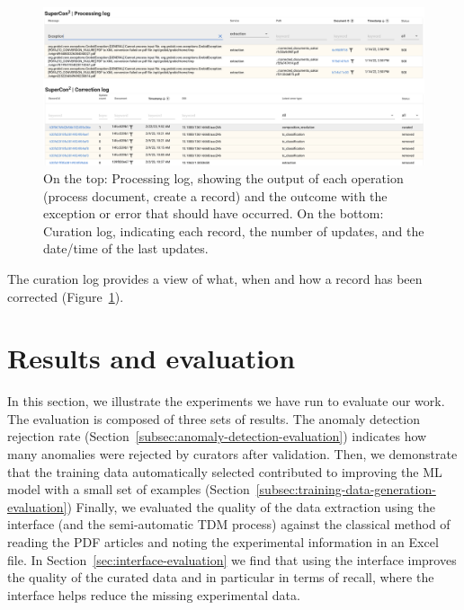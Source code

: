 \documentclass[a4paper]{article}
\begin{document}
\begin{figure}[ht]
  \centering
  \includegraphics[width=1\textwidth]{images/processing-curation-log.png} 
  \caption{On the top: Processing log, showing the output of each operation (process document, create a record) and the outcome with the exception or error that should have occurred. On the bottom: Curation log, indicating each record, the number of updates, and the date/time of the last updates.}
  \label{fig:processing-curation-log}
\end{figure}

The curation log provides a view of what, when and how a record has been corrected (Figure~\ref{fig:processing-curation-log}).





\section{Results and evaluation}

In this section, we illustrate the experiments we have run to evaluate our work. 
The evaluation is composed of three sets of results. 
The anomaly detection rejection rate (Section~\ref{subsec:anomaly-detection-evaluation}) indicates how many anomalies were rejected by curators after validation. 
Then, we demonstrate that the training data automatically selected contributed to improving the ML model with a small set of examples (Section~\ref{subsec:training-data-generation-evaluation}) 
Finally, we evaluated the quality of the data extraction using the interface (and the semi-automatic TDM process) against the classical method of reading the PDF articles and noting the experimental information in an Excel file. In Section~\ref{sec:interface-evaluation} we find that using the interface improves the quality of the curated data and in particular in terms of recall, where the interface helps reduce the missing experimental data. 
\end{document}
